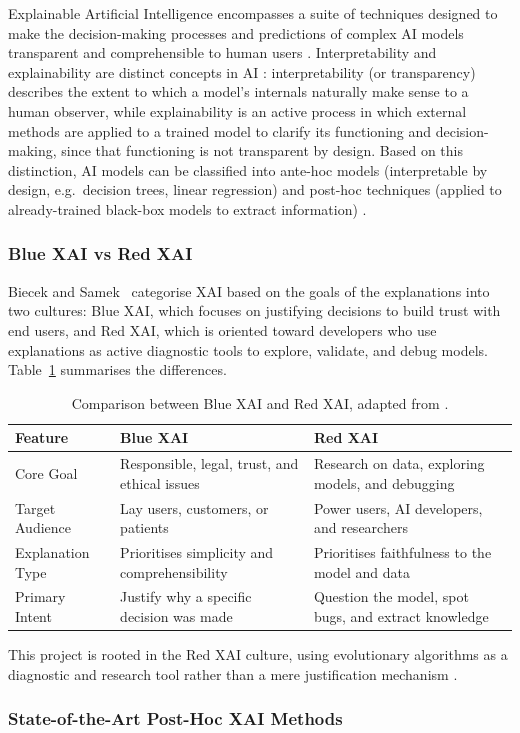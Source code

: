 \label{ssub:xai}

Explainable Artificial Intelligence encompasses a suite of techniques designed to make the
decision-making processes and predictions of complex AI models transparent and comprehensible to human
users \cite{Arrieta2020}. Interpretability and explainability are distinct concepts in AI
\cite{Arrieta2020}: interpretability (or transparency) describes the extent to which a model's
internals naturally make sense to a human observer, while explainability is an active process in which
external methods are applied to a trained model to clarify its functioning and decision-making, since
that functioning is not transparent by design. Based on this distinction, AI models can be classified
into ante-hoc models (interpretable by design, e.g.\ decision trees, linear regression) and post-hoc
techniques (applied to already-trained black-box models to extract information)
\cite{Arrieta2020,Longo2024}.

\subsubsection{Blue XAI vs Red XAI}
\label{ssub:blue-red}

Biecek and Samek~\cite{Biecek2024} categorise XAI based on the goals of the explanations into two
cultures: Blue XAI, which focuses on justifying decisions to build trust with end users, and Red XAI,
which is oriented toward developers who use explanations as active diagnostic tools to explore,
validate, and debug models. Table~\ref{tab:bluered} summarises the differences.

\begin{table}[H]
\centering
\caption{Comparison between Blue XAI and Red XAI, adapted from \cite{Biecek2024}.}
\label{tab:bluered}
\begin{tabular}{p{2.5cm}p{5cm}p{5cm}}
\toprule
\textbf{Feature} & \textbf{Blue XAI} & \textbf{Red XAI} \\
\midrule
Core Goal & Responsible, legal, trust, and ethical issues & Research on data, exploring models, and debugging \\
Target Audience & Lay users, customers, or patients & Power users, AI developers, and researchers \\
Explanation Type & Prioritises simplicity and comprehensibility & Prioritises faithfulness to the model and data \\
Primary Intent & Justify why a specific decision was made & Question the model, spot bugs, and extract knowledge \\
\bottomrule
\end{tabular}
\end{table}
\noindent
This project is rooted in the Red XAI culture, using evolutionary algorithms as a diagnostic and
research tool rather than a mere justification mechanism \cite{Biecek2024, Yedjour2024}.

\subsubsection{State-of-the-Art Post-Hoc XAI Methods}
\label{ssub:sota}

